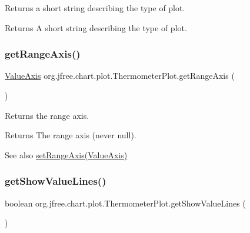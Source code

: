Returns a short string describing the type of plot.

\begin{DoxyReturn}{Returns}
A short string describing the type of plot. 
\end{DoxyReturn}
\mbox{\label{classorg_1_1jfree_1_1chart_1_1plot_1_1_thermometer_plot_adf4efa3e5c45b90fe1e994852291cda8}} 
\subsubsection{\texorpdfstring{get\+Range\+Axis()}{getRangeAxis()}}
{\footnotesize\ttfamily \mbox{\hyperlink{classorg_1_1jfree_1_1chart_1_1axis_1_1_value_axis}{Value\+Axis}} org.\+jfree.\+chart.\+plot.\+Thermometer\+Plot.\+get\+Range\+Axis (\begin{DoxyParamCaption}{ }\end{DoxyParamCaption})}

Returns the range axis.

\begin{DoxyReturn}{Returns}
The range axis (never {\ttfamily null}).
\end{DoxyReturn}
\begin{DoxySeeAlso}{See also}
\mbox{\hyperlink{classorg_1_1jfree_1_1chart_1_1plot_1_1_thermometer_plot_a1b5f371cd3f13e37737f09372ba85fa9}{set\+Range\+Axis(\+Value\+Axis)}} 
\end{DoxySeeAlso}
\mbox{\label{classorg_1_1jfree_1_1chart_1_1plot_1_1_thermometer_plot_a8818f4444cbc3cbd0e8cada43d4e3c6f}} 
\subsubsection{\texorpdfstring{get\+Show\+Value\+Lines()}{getShowValueLines()}}
{\footnotesize\ttfamily boolean org.\+jfree.\+chart.\+plot.\+Thermometer\+Plot.\+get\+Show\+Value\+Lines (\begin{DoxyParamCaption}{ }\end{DoxyParamCaption})}

